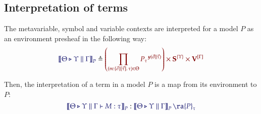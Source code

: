 \subsection{Interpretation of terms}

The metavariable, symbol and variable contexts are interpreted for a model $P$ as
an environment presheaf in the following way:
\[
  \Define{
    \SemBrackets{
      \Theta\triangleright\Upsilon\parallel\Gamma
    }_P
  }{
    \left(
      \prod_{
        (m:%
        \MkValence
          {\vec{\sigma}}
          {\vec{\tau}}
          {\tau})
        \in\Theta
      }{{P_{\tau}}^{\Yoneda{\vec{\sigma}\parallel\vec{\tau}}}}
    \right)
    \times
    \SymPsh^{\{\Upsilon\}}
    \times
    \VarPsh^{[\Gamma]}
  }
\]

Then, the interpretation of a term in a model $P$ is a map from its environment
to $P$:
\[
  \Of{
    \SemBrackets{
      \Theta\triangleright\Upsilon\parallel\Gamma\vdash M:\tau
    }_{P}
  }{
    \SemBrackets{
      \Theta\triangleright\Upsilon\parallel\Gamma
    }_{P}\ra {P}_{\tau}
  }
\]


